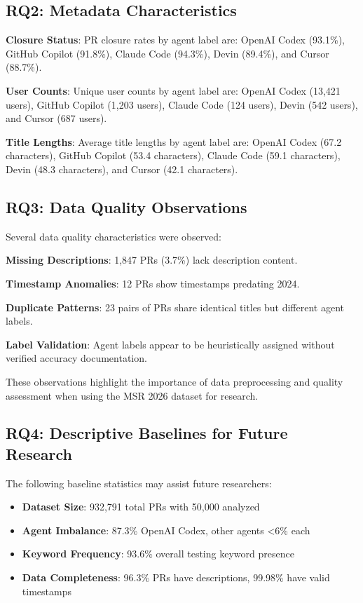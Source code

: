 \documentclass[conference]{IEEEtran}
\begin{document}
\subsection{RQ2: Metadata Characteristics}

\textbf{Closure Status}: PR closure rates by agent label are: OpenAI Codex (93.1\%), GitHub Copilot (91.8\%), Claude Code (94.3\%), Devin (89.4\%), and Cursor (88.7\%).

\textbf{User Counts}: Unique user counts by agent label are: OpenAI Codex (13,421 users), GitHub Copilot (1,203 users), Claude Code (124 users), Devin (542 users), and Cursor (687 users).

\textbf{Title Lengths}: Average title lengths by agent label are: OpenAI Codex (67.2 characters), GitHub Copilot (53.4 characters), Claude Code (59.1 characters), Devin (48.3 characters), and Cursor (42.1 characters).

\subsection{RQ3: Data Quality Observations}

Several data quality characteristics were observed:

\textbf{Missing Descriptions}: 1,847 PRs (3.7\%) lack description content.

\textbf{Timestamp Anomalies}: 12 PRs show timestamps predating 2024.

\textbf{Duplicate Patterns}: 23 pairs of PRs share identical titles but different agent labels.

\textbf{Label Validation}: Agent labels appear to be heuristically assigned without verified accuracy documentation.

These observations highlight the importance of data preprocessing and quality assessment when using the MSR 2026 dataset for research.

\subsection{RQ4: Descriptive Baselines for Future Research}

The following baseline statistics may assist future researchers:

\begin{itemize}
    \item \textbf{Dataset Size}: 932,791 total PRs with 50,000 analyzed
    \item \textbf{Agent Imbalance}: 87.3\% OpenAI Codex, other agents <6\% each
    \item \textbf{Keyword Frequency}: 93.6\% overall testing keyword presence
    \item \textbf{Data Completeness}: 96.3\% PRs have descriptions, 99.98\% have valid timestamps
\end{itemize}
\end{document}
